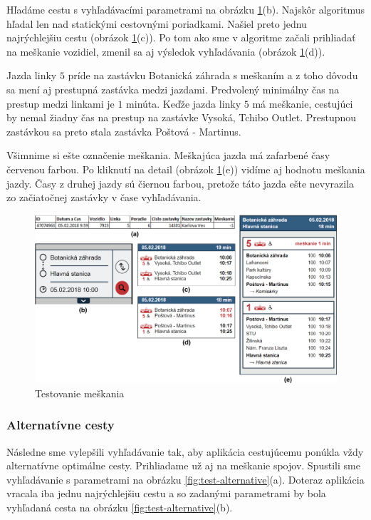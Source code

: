 Hľadáme cestu s vyhľadávacími parametrami na obrázku \ref{fig:test-delay}(b). Najskôr algoritmus hľadal len nad statickými cestovnými poriadkami. Našiel preto jednu najrýchlejšiu cestu (obrázok \ref{fig:test-delay}(c)). 
Po tom ako sme v algoritme začali prihliadať na meškanie vozidiel, zmenil sa aj výsledok vyhľadávania (obrázok \ref{fig:test-delay}(d)). 

Jazda linky $5$ príde na zastávku Botanická záhrada s meškaním a z toho dôvodu sa mení aj prestupná zastávka medzi jazdami. Predvolený minimálny čas na prestup medzi linkami je $1$ minúta. Keďže jazda linky $5$ má meškanie, cestujúci by nemal žiadny čas na prestup na zastávke Vysoká, Tchibo Outlet. Prestupnou zastávkou sa preto stala zastávka Poštová - Martinus.

Všimnime si ešte označenie meškania. Meškajúca jazda má zafarbené časy červenou farbou. Po kliknutí na detail (obrázok \ref{fig:test-delay}(e)) vidíme aj hodnotu meškania jazdy. Časy z druhej jazdy sú čiernou farbou, pretože táto jazda ešte nevyrazila zo začiatočnej zastávky v čase vyhľadávania. 

\begin{figure}[H]
\centerline{\includegraphics[width=1.0\textwidth]{images/test/delay}}
\caption[Testovanie meškania]{Testovanie meškania}
\label{fig:test-delay}
\end{figure}

\subsubsection{Alternatívne cesty}
Následne sme vylepšili vyhľadávanie tak, aby aplikácia cestujúcemu ponúkla vždy alternatívne optimálne cesty. Prihliadame už aj na meškanie spojov. Spustili sme vyhľadávanie s parametrami na obrázku \ref{fig:test-alternative}(a). Doteraz aplikácia vracala iba jednu najrýchlejšiu cestu a so zadanými parametrami by bola vyhľadaná cesta na obrázku \ref{fig:test-alternative}(b).

